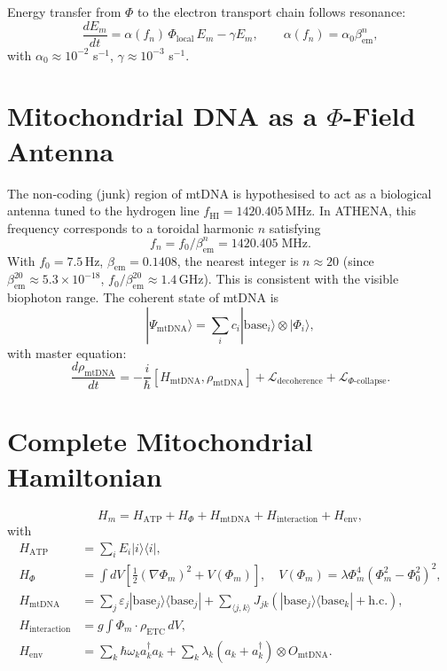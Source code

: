 \documentclass[11pt]{article}
\newcommand{\bem}{\beta_{\mathrm{em}}}
\newcommand{\half}{\tfrac{1}{2}}
\newcommand{\Phizero}{\Phi_{0}}
\newcommand{\mtDNA}{\mathrm{mtDNA}}
\begin{document}
Energy transfer from $\Phi$ to the electron transport chain follows resonance:
\begin{equation}
\frac{dE_m}{dt} = \alpha(f_n)\,\Phi_{\mathrm{local}}\,E_m - \gamma E_m,\qquad \alpha(f_n)=\alpha_0\bem^{n},
\label{eq:energy_transfer}
\end{equation}
with $\alpha_0\approx10^{-2}$ s$^{-1}$, $\gamma\approx10^{-3}$ s$^{-1}$.

\section{Mitochondrial DNA as a $\Phi$-Field Antenna}
\label{sec:mtdna}

The non‑coding (junk) region of mtDNA is hypothesised to act as a biological antenna tuned to the hydrogen line $f_{\mathrm{HI}}=1420.405$ MHz. In ATHENA, this frequency corresponds to a toroidal harmonic $n$ satisfying
\begin{equation}
f_n = f_0/\bem^{n} = 1420.405\;\mathrm{MHz}.
\label{eq:hydrogen_line}
\end{equation}
With $f_0=7.5$ Hz, $\bem=0.1408$, the nearest integer is $n\approx20$ (since $\bem^{20}\approx5.3\times10^{-18}$, $f_0/\bem^{20}\approx1.4$ GHz). This is consistent with the visible biophoton range. The coherent state of mtDNA is
\begin{equation}
|\Psi_{\mtDNA}\rangle = \sum_i c_i |\mathrm{base}_i\rangle \otimes |\Phi_i\rangle,
\label{eq:mtdna_state}
\end{equation}
with master equation:
\begin{equation}
\frac{d\rho_{\mtDNA}}{dt} = -\frac{i}{\hbar}[H_{\mtDNA}, \rho_{\mtDNA}] + \mathcal{L}_{\mathrm{decoherence}} + \mathcal{L}_{\Phi\text{-collapse}}.
\label{eq:mtdna_master}
\end{equation}

\section{Complete Mitochondrial Hamiltonian}
\label{sec:hamiltonian}
\begin{equation}
H_m = H_{\mathrm{ATP}} + H_{\Phi} + H_{\mtDNA} + H_{\mathrm{interaction}} + H_{\mathrm{env}},
\label{eq:total_hamiltonian}
\end{equation}
with
\begin{align}
H_{\mathrm{ATP}} &= \sum_i E_i |i\rangle\langle i|,\\
H_{\Phi} &= \int dV \left[ \half (\nabla\Phi_m)^2 + V(\Phi_m) \right],\quad V(\Phi_m)=\lambda \Phi_m^4(\Phi_m^2-\Phizero^2)^2,\\
H_{\mtDNA} &= \sum_j \varepsilon_j |\mathrm{base}_j\rangle\langle\mathrm{base}_j| + \sum_{\langle j,k\rangle} J_{jk} (|\mathrm{base}_j\rangle\langle\mathrm{base}_k| + \mathrm{h.c.}),\\
H_{\mathrm{interaction}} &= g \int \Phi_m \cdot \rho_{\mathrm{ETC}} \, dV,\\
H_{\mathrm{env}} &= \sum_k \hbar\omega_k a_k^\dagger a_k + \sum_k \lambda_k (a_k + a_k^\dagger) \otimes O_{\mtDNA}.
\end{align}
\end{document}
